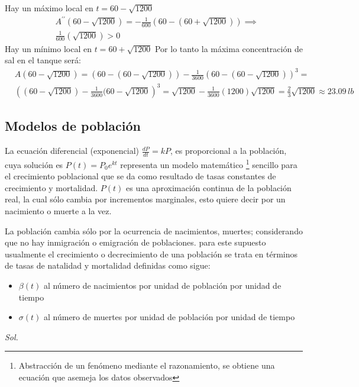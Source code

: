 Hay un máximo local en $t=60-\sqrt{1200}$
\begin{align*}
    &A^{\prime\prime}\left(60-\sqrt{1200}\right)=-\frac{1}{600}\left(60-\left(60+\sqrt{1200}\right)\right)\implies \\
    &\frac{1}{600}\left(\sqrt{1200}\right)>0
\end{align*}
Hay un mínimo local en $t=60+\sqrt{1200}$
Por lo tanto la máxima concentración de sal en el tanque será:
\begin{align*}
    &A\left(60-\sqrt{1200}\right)=\left(60-\left(60-\sqrt{1200}\right)\right)-\frac{1}{3600}\left(60-\left(60-\sqrt{1200}\right)\right)^3=\\
    &\left(\left(60-\sqrt{1200}\right)-\frac{1}{3600}(60-\sqrt{1200}\right)^3=\sqrt{1200}-\frac{1}{3600}(1200)\sqrt{1200}=\frac{2}{3}\sqrt{1200}\approx 23.09\, lb
\end{align*}

\subsection{Modelos de población}

La ecuación diferencial (exponencial) $\frac{dP}{dt}=kP$, es proporcional a la población, cuya solución es $P(t)=P_0e^{kt}$ representa un modelo matemático \footnote{Abstracción de un fenómeno mediante el razonamiento, se obtiene una ecuación que asemeja los datos observados} sencillo para el crecimiento poblacional
que se da como resultado de tasas constantes de crecimiento y mortalidad. $P(t)$ es una aproximación continua de la población real, la cual sólo cambia por incrementos marginales, esto quiere decir por un nacimiento o muerte a la vez.
\begin{remark}
    La población cambia sólo por la ocurrencia de nacimientos, muertes; considerando que no hay inmigración o emigración de poblaciones. para este supuesto usualmente el crecimiento o decrecimiento de una población se trata en términos de tasas de natalidad y mortalidad definidas como sigue: 
    \begin{itemize}
        \item $\beta(t)$ al número de nacimientos por unidad de población por unidad de tiempo
        \item $\sigma(t)$ al número de muertes por unidad de población por unidad de tiempo
    \end{itemize}
\end{remark}
\textit{ Sol. }

